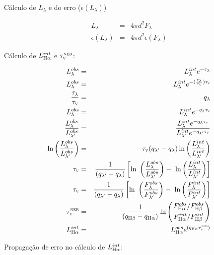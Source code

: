 \documentclass[a4paper,12pt]{article}
\newcommand{\tauV}{\tau_{\mathrm{\textsc{v}}}}
\newcommand{\tauVN}{\tau_{\mathrm{\textsc{v}}}^{\mathrm{\textsc{neb}}}}
\newcommand{\Halpha}{\ifmmode \mathrm{H}\alpha \else H$\alpha$\xspace \fi}
\newcommand{\Hbeta}{\ifmmode \mathrm{H}\beta \else H$\beta$\xspace \fi}
\begin{document}
Cálculo de $L_\lambda$ e do erro ($\epsilon (L_\lambda)$)

\begin{eqnarray}
	L_\lambda &=& 4 \pi d^2 F_\lambda \\
	\epsilon (L_\lambda) &=& 4 \pi d^2 \epsilon (F_\lambda)
\end{eqnarray}

Cálculo de $L_{\Halpha}^{int}$ e $\tauVN$:
 
\begin{eqnarray}
	L_\lambda^{obs} &=& L_\lambda^{int} e^{-\tau_\lambda} \\
	L_\lambda^{obs} &=& L_\lambda^{int} e^{-(\frac{\tau_\lambda}{\tauV}) \tauV} \\
	\frac{\tau_\lambda}{\tauV} &=& q_\lambda \\
	L_\lambda^{obs} &=& L_\lambda^{int} e^{-q_\lambda \tauV} \\
	\frac{L_\lambda^{obs}}{L_{\lambda^\prime}^{obs}} &=& \
\frac{L_\lambda^{int} e^{-q_\lambda \tauV}}{L_{\lambda^\prime}^{int} e^{-q_{\lambda^\prime} \tauV}} \\
	\ln \left(\frac{L_\lambda^{obs}}{L_{\lambda^\prime}^{obs}}\right) &=& \
\tauV (q_{\lambda^\prime} - q_\lambda) \ln \left(\frac{L_\lambda^{int}}{L_{\lambda^\prime}^{int}}\right) \\
	\tauV &=& \frac{1}{(q_{\lambda^\prime} - q_\lambda)} \left[\ln \ 
\left(\frac{L_\lambda^{obs}}{L_{\lambda^\prime}^{obs}}\right) - \
\ln \left(\frac{L_\lambda^{int}}{L_{\lambda^\prime}^{int}}\right)\right] \\
	\tauV &=& \frac{1}{(q_{\lambda^\prime} - q_\lambda)} \left[\ln \
\left(\frac{F_\lambda^{obs}}{F_{\lambda^\prime}^{obs}}\right) - \
\ln \left(\frac{F_\lambda^{int}}{F_{\lambda^\prime}^{int}}\right)\right] \\
	\tauVN &=& \frac{1}{(q_{\Hbeta} - q_{\Halpha})} \ln \left( \frac{ F_{\Halpha}^{obs} / F_{\Hbeta}^{obs}}{F_{\Halpha}^{int} / F_{\Hbeta}^{int}} \right) \\
	L_{\Halpha}^{int} &=& L_{\Halpha}^{obs} e^{(q_{\Halpha} \tauVN)} 
\end{eqnarray}

Propagação de erro no cálculo de $L_{\Halpha}^{int}$:
\end{document}
